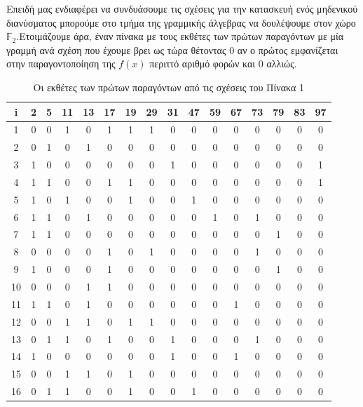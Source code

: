 \documentclass[12pt]{article}
\numberwithin{equation}{section}
\renewcommand{\arraystretch}{1.5}
\begin{document}
Επειδή μας ενδιαφέρει να συνδυάσουμε τις σχέσεις για την κατασκευή ενός μηδενικού διανύσματος μπορούμε στο τμήμα της γραμμικής άλγεβρας να δουλέψουμε στον χώρο $\mathbb{F}_2$.Ετοιμάζουμε άρα, έναν πίνακα με τους εκθέτες των πρώτων παραγόντων με μία γραμμή ανά σχέση που έχουμε βρει ως τώρα θέτοντας 0 αν ο πρώτος εμφανίζεται στην παραγοντοποίηση της $f(x)$ περιττό αριθμό φορών και 0 αλλιώς.

\begin{table}[t]
    \centering
    \caption{Οι εκθέτες των πρώτων παραγόντων από τις σχέσεις του Πίνακα 1}
    \label{Quadratic Sieve prime factor exponents}
    \setlength{\tabcolsep}{0.5em}
    {\renewcommand{\arraystretch}{1.2}}
    \begin{adjustbox}{width=0.8\textwidth}
    \begin{tabular}{|c|c|c|c|c|c|c|c|c|c|c|c|c|c|c|c|}
        \hline
        i & 2 & 5 & 11 & 13 & 17 & 19 & 29 & 31 & 47 & 59 & 67 & 73 & 79 & 83 & 97 \\
        \hline
        1 & 0 & 0 & 1 & 0 & 1 & 1 & 1 & 0 & 0 & 0 & 0 & 0 & 0 & 0 & 0 \\
        \hline
        2 & 0 & 1 & 0 & 1 & 0 & 0 & 0 & 0 & 0 & 0 & 0 & 0 & 0 & 0 & 0 \\
        \hline
        3 & 1 & 0 & 0 & 0 & 0 & 0 & 0 & 1 & 0 & 0 & 0 & 0 & 0 & 0 & 1 \\
        \hline
        4 & 1 & 1 & 0 & 0 & 1 & 1 & 0 & 0 & 0 & 0 & 0 & 0 & 0 & 0 & 1 \\
        \hline
        5 & 1 & 0 & 1 & 0 & 0 & 1 & 0 & 0 & 1 & 0 & 0 & 0 & 0 & 0 & 0 \\
        \hline
        6 & 1 & 1 & 0 & 1 & 0 & 0 & 0 & 0 & 0 & 1 & 0 & 1 & 0 & 0 & 0 \\
        \hline
        7 & 1 & 1 & 0 & 0 & 0 & 0 & 0 & 0 & 0 & 0 & 0 & 0 & 1 & 0 & 0 \\
        \hline
        8 & 0 & 0 & 0 & 0 & 1 & 0 & 1 & 0 & 0 & 0 & 0 & 1 & 0 & 0 & 0 \\
        \hline
        9 & 1 & 0 & 0 & 0 & 1 & 0 & 0 & 0 & 0 & 0 & 0 & 0 & 1 & 0 & 0 \\
        \hline
        10 & 0 & 0 & 0 & 1 & 1 & 0 & 0 & 0 & 0 & 0 & 0 & 0 & 0 & 0 & 0 \\
        \hline
        11 & 1 & 1 & 0 & 1 & 0 & 0 & 0 & 0 & 0 & 0 & 1 & 0 & 0 & 0 & 0 \\
        \hline
        12 & 0 & 0 & 1 & 1 & 0 & 1 & 1 & 0 & 0 & 0 & 0 & 0 & 0 & 0 & 0 \\
        \hline
        13 & 0 & 1 & 1 & 0 & 1 & 0 & 0 & 1 & 0 & 0 & 0 & 1 & 0 & 0 & 0 \\
        \hline
        14 & 1 & 0 & 0 & 0 & 0 & 0 & 0 & 1 & 0 & 0 & 1 & 0 & 0 & 0 & 0 \\
        \hline
        15 & 0 & 0 & 1 & 1 & 0 & 1 & 0 & 0 & 0 & 0 & 0 & 0 & 0 & 0 & 0 \\
        \hline
        16 & 0 & 1 & 1 & 0 & 0 & 1 & 0 & 0 & 1 & 0 & 0 & 0 & 0 & 0 & 0 \\
        \hline
    \end{tabular}
    \end{adjustbox}
\end{table}
\end{document}
